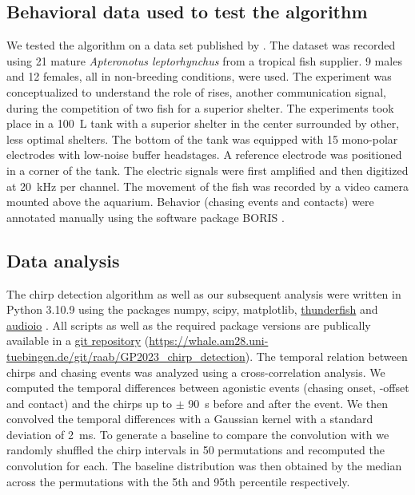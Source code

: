 \subsection{Behavioral data used to test the algorithm } \label{Behaviour}

We tested the algorithm on a data set published by \textcite{raabElectrocommunicationSignalsIndicate2021}. The dataset was recorded using 21 mature \textit{Apteronotus leptorhynchus} from a tropical fish supplier. 9 males and 12 females, all in non-breeding conditions, were used. The experiment was conceptualized to understand the role of rises, another communication signal, during the competition of two fish for a superior shelter. The experiments took place in a \SI{100}{\liter} tank with a superior shelter in the center surrounded by other, less optimal shelters. The bottom of the tank was equipped with 15 mono-polar electrodes with low-noise buffer headstages. A reference electrode was positioned in a corner of the tank. The electric signals were first amplified and then digitized at \SI{20}{\kilo\hertz} per channel. The movement of the fish was recorded by a video camera mounted above the aquarium. Behavior (chasing events and contacts) were annotated manually using the software package BORIS \parencite{https://doi.org/10.1111/2041-210X.12584}.

\subsection{Data analysis}

The chirp detection algorithm as well as our subsequent analysis were written in Python 3.10.9 using the packages numpy, scipy, matplotlib, \href{https://github.com/janscience/thunderfish}{thunderfish} and \href{https://github.com/janscience/audioio}{audioio} \parencite{2020SciPy-NMeth, Hunter:2007, harris2020array}. All scripts as well as the required package versions are publically available in a \href{https://whale.am28.uni-tuebingen.de/git/raab/GP2023_chirp_detection}{git repository} (\url{https://whale.am28.uni-tuebingen.de/git/raab/GP2023_chirp_detection}). The temporal relation between chirps and chasing events was analyzed using a cross-correlation analysis. We computed the temporal differences between agonistic events (chasing onset, -offset and contact) and the chirps up to $\pm$ \SI{90}{\second} before and after the event. We then convolved the temporal differences with a Gaussian kernel with a standard deviation of \SI{2}{\milli\second}. To generate a baseline to compare the convolution with we randomly shuffled the chirp intervals in 50 permutations and recomputed the convolution for each. The baseline distribution was then obtained by the median across the permutations with the 5th and 95th percentile respectively.